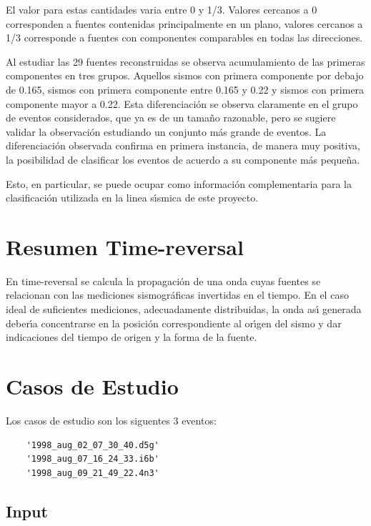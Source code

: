 El valor para estas cantidades varia entre 0 y 1/3. Valores
cercanos a 0 corresponden a fuentes contenidas principalmente
en un plano, valores cercanos a 1/3 corresponde a fuentes
con componentes comparables en todas las direcciones.

Al estudiar las 29 fuentes reconstruidas se observa
acumulamiento de las primeras componentes en tres grupos.
Aquellos sismos con primera componente por debajo
de 0.165, sismos con primera componente entre 0.165
y 0.22 y sismos con primera componente mayor a 0.22.
Esta diferenciaci\'on se observa claramente en el
grupo de eventos considerados, que ya es de un tama\~no
razonable, pero se sugiere validar la observaci\'on
estudiando un conjunto m\'as grande de eventos. La
diferenciaci\'on observada confirma en primera instancia, de
manera muy positiva, la posibilidad de clasificar
los eventos de acuerdo a su componente m\'as peque\~na.

Esto, en particular, se puede ocupar como informaci\'on
complementaria para la clasificaci\'on utilizada en la linea s\'{\i}smica
de este proyecto.

\section{Resumen Time-reversal}

En time-reversal se calcula la propagaci\'on de una onda cuyas fuentes se relacionan
con las mediciones sismogr\'aficas invertidas en el tiempo. En el caso ideal de suficientes
mediciones, adecuadamente distribuidas, la onda as\'{\i} generada deber\'{\i}a
concentrarse en la posici\'on correspondiente al or\'{\i}gen del sismo y dar indicaciones
del tiempo de origen y la forma de la fuente.

\section{Casos de Estudio}

Los casos de estudio son los siguentes $3$ eventos:

\begin{verbatim}
    '1998_aug_02_07_30_40.d5g'
    '1998_aug_07_16_24_33.i6b'
    '1998_aug_09_21_49_22.4n3'
\end{verbatim}



\subsection{Input}

